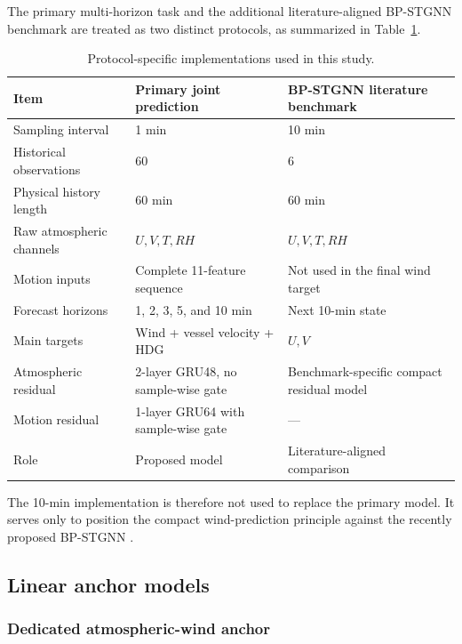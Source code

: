 The primary multi-horizon task and the additional literature-aligned BP-STGNN benchmark are treated as two distinct protocols, as summarized in Table~\ref{tab:protocols}.

\begin{table}[!t]
\centering
\caption{Protocol-specific implementations used in this study.}
\label{tab:protocols}
\begin{tabular}{p{3.3cm}p{5.4cm}p{5.4cm}}
\hline
\textbf{Item} &
\textbf{Primary joint prediction} &
\textbf{BP-STGNN literature benchmark} \\
\hline
Sampling interval
& 1 min
& 10 min
\\
Historical observations
& 60
& 6
\\
Physical history length
& 60 min
& 60 min
\\
Raw atmospheric channels
& $U,V,T,RH$
& $U,V,T,RH$
\\
Motion inputs
& Complete 11-feature sequence
& Not used in the final wind target
\\
Forecast horizons
& 1, 2, 3, 5, and 10 min
& Next 10-min state
\\
Main targets
& Wind + vessel velocity + HDG
& $U,V$
\\
Atmospheric residual
& 2-layer GRU48, no sample-wise gate
& Benchmark-specific compact residual model
\\
Motion residual
& 1-layer GRU64 with sample-wise gate
& ---
\\
Role
& Proposed model
& Literature-aligned comparison
\\
\hline
\end{tabular}
\end{table}

The 10-min implementation is therefore not used to replace the primary model. It serves only to position the compact wind-prediction principle against the recently proposed BP-STGNN \cite{Nie2026}.

\subsection{Linear anchor models}
\label{subsec:linear_anchors}

\subsubsection{Dedicated atmospheric-wind anchor}
\label{subsubsec:wind_anchor}

